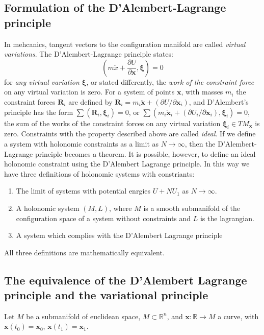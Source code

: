 \documentclass[conference]{IEEEtran}
\theoremstyle{definition}
\theoremstyle{remark}
\begin{document}
    \subsection{Formulation of the D'Alembert-Lagrange principle}
    In mehcanics, tangent vectors to the configuration manifold are called \emph{virtual variations}. The D'Alembert-Lagrange principle states:
    \begin{equation*}
        \left( m \ddot{x} + \dfrac{\partial U}{\partial \mathbf{x}}, \bm{\xi} \right) = 0
    \end{equation*}
    for \emph{any virtual variation $\bm{\xi}$}, or stated differently, the \emph{work of the constraint force} on any virtual variation is zero. For a system of points $\mathbf{x}$, with masses $m_i$ the constraint forces $\mathbf{R}_i$ are defined by $\mathbf{R}_i = m_i \ddot{\mathbf{x}} + (\partial U / \partial \mathbf{x}_i)$, and D'Alembert's principle has the form $\sum (\mathbf{R}_i, \bm{\xi}_i) = 0$, or $\sum (m_i \ddot{\mathbf{x}}_i + (\partial U_i / \partial \mathbf{x}_i), \bm{\xi}_i) = 0$, the sum of the works of the constraint forces on any virtual variation ${\bm{\xi}_i} \in TM_{\mathbf{x}}$ is zero. Constraints with the property described above are called \emph{ideal}. If we define a system with holonomic constraints as a limit as $N \to \infty$, then the D'Alembert-Lagrange principle becomes a theorem. It is possible, however, to define an ideal holonomic constraint using the D'Alembert Lagrange principle. In this way we have three definitions of holonomic systems with constriants:
    \begin{enumerate}
        \item The limit of systems with potential enrgies $U + NU_1$ as $N \to \infty$.
        \item A holonomic system $(M, L)$, where $M$ is a smooth submanifold of the configuration space of a system without constraints and $L$ is the lagrangian.
        \item A system which complies with the D'Alembert Lagrange principle
    \end{enumerate}
    All three definitions are mathematically equivalent.

    \subsection{The equivalence of the D'Alembert Lagrange principle and the variational principle}
    Let $M$ be a submanifold of euclidean space, $M \subset \mathbb{R}^n$, and $\mathbf{x}: \mathbb{R} \to M$ a curve, with $\mathbf{x}(t_0) = \mathbf{x}_0$, $\mathbf{x}(t_1) = \mathbf{x}_1$.
\end{document}
